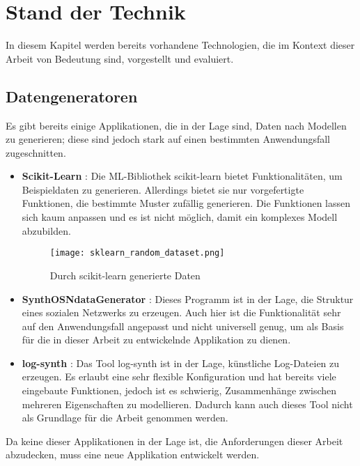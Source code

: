 
\chapter{Stand der Technik}

In diesem Kapitel werden bereits vorhandene Technologien, die im Kontext dieser Arbeit von Bedeutung sind, vorgestellt und evaluiert.

\section{Datengeneratoren}

Es gibt bereits einige Applikationen, die in der Lage sind, Daten nach Modellen zu generieren; diese sind jedoch stark auf einen bestimmten Anwendungsfall zugeschnitten.

\begin{itemize}
    \item \textbf{Scikit-Learn} \cite{scikit-learn:paper, scikit-learn:generator}: Die \ac{ML}-Bibliothek scikit-learn bietet Funktionalitäten, um Beispieldaten zu generieren. Allerdings bietet sie nur vorgefertigte Funktionen, die bestimmte Muster zufällig generieren. Die Funktionen lassen sich kaum anpassen und es ist nicht möglich, damit ein komplexes Modell abzubilden.
    \begin{figure}[H]
        \centering
        \texttt{[image: sklearn\_random\_dataset.png]}
        \caption{Durch scikit-learn generierte Daten \cite{scikit-learn:plots}}
        \label{fig:sklearndata}
    \end{figure}
    \item \textbf{SynthOSNdataGenerator} \cite{synthosndatagenerator}: Dieses Programm ist in der Lage, die Struktur eines sozialen Netzwerks zu erzeugen. Auch hier ist die Funktionalität sehr auf den Anwendungsfall angepasst und nicht universell genug, um als Basis für die in dieser Arbeit zu entwickelnde Applikation zu dienen.
    \item \textbf{log-synth} \cite{logsynth}: Das Tool log-synth ist in der Lage, künstliche Log-Dateien zu erzeugen. Es erlaubt eine sehr flexible Konfiguration und hat bereits viele eingebaute Funktionen, jedoch ist es schwierig, Zusammenhänge zwischen mehreren Eigenschaften zu modellieren. Dadurch kann auch dieses Tool nicht als Grundlage für die Arbeit genommen werden.
\end{itemize}

Da keine dieser Applikationen in der Lage ist, die Anforderungen dieser Arbeit abzudecken, muss eine neue Applikation entwickelt werden.

